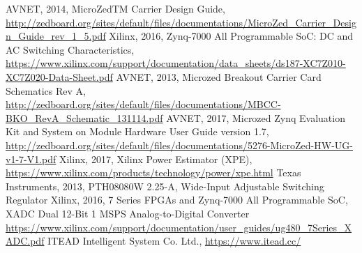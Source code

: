 \begin{thebibliography}{21} %
    AVNET, 2014, MicroZedTM Carrier Design Guide, \url{http://zedboard.org/sites/default/files/documentations/MicroZed_Carrier_Design_Guide_rev_1_5.pdf}
  	Xilinx, 2016, Zynq-7000 All Programmable SoC: DC and AC Switching Characteristics, \url{https://www.xilinx.com/support/documentation/data_sheets/ds187-XC7Z010-XC7Z020-Data-Sheet.pdf}
  	AVNET, 2013, Microzed Breakout Carrier Card Schematics Rev A, \url{http://zedboard.org/sites/default/files/documentations/MBCC-BKO_RevA_Schematic_131114.pdf}
  	AVNET, 2017, Microzed Zynq Evaluation Kit and System on Module Hardware User Guide version 1.7, \url{http://zedboard.org/sites/default/files/documentations/5276-MicroZed-HW-UG-v1-7-V1.pdf}
  	Xilinx, 2017, Xilinx Power Estimator (XPE), \url{https://www.xilinx.com/products/technology/power/xpe.html}
  	Texas Instruments, 2013, PTH08080W 2.25-A, Wide-Input Adjustable Switching Regulator
    Xilinx, 2016, 7 Series FPGAs and Zynq-7000 All Programmable SoC, XADC Dual 12-Bit 1 MSPS Analog-to-Digital Converter \url{https://www.xilinx.com/support/documentation/user_guides/ug480_7Series_XADC.pdf}
    ITEAD Intelligent System Co. Ltd., \url{https://www.itead.cc/}
\end{thebibliography}
